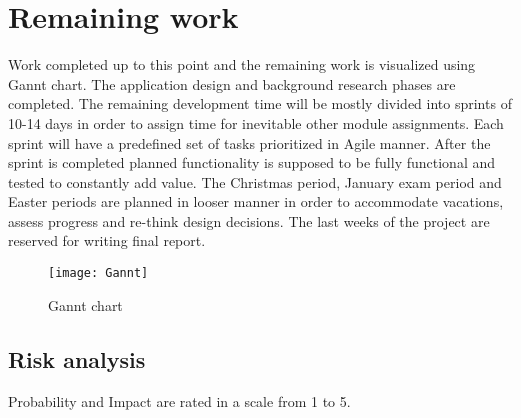 \section{Remaining work}

Work completed up to this point and the remaining work is visualized using Gannt chart. The application design and background research phases are completed. The remaining development time will be mostly divided into sprints of 10-14 days in order to assign time for inevitable other module assignments. Each sprint will have a predefined set of tasks prioritized in Agile manner. After the sprint is completed planned functionality is supposed to be fully functional and tested to constantly add value. The Christmas period, January exam period and Easter periods are planned in looser manner in order to accommodate vacations, assess progress and re-think design decisions. The last weeks of the project are reserved for writing final report.

\begin{figure}
\caption{Gannt chart}
\texttt{[image: Gannt]}
\centering
\end{figure}


\subsection{Risk analysis}
Probability and Impact are rated in a scale from 1 to 5.

\def\riska{Loss of source code at some stage of development}
\def \probabilitya {1}
\def \impacta {4}
\def \mitigationa {Use of remote source control  repository to frequently record every stage of the development, thus being able to recover it if needed. }

\def\riskaa{Unable to fulfill all of the requirements due to technical implemention difficulties}
\def \probabilityaa {3}
\def \impactaa {2}
\def \mitigationaa {During the start of development process requirements will be split into tasks, divided into sprints and ranked using Agile methodology, therefore ensuring that core functionality will be implemented first and a working proof of concept is available at the end of the project }

\def\riskaaa{Loss of development time due to other course modules}
\def \probabilityaaa {2}
\def \impactaaa {2}
\def \mitigationaaa {Dedicate fixed amount of time every week for the project in order to keep up with the schedule }

\def\riskaaaa{Some part of the project taking up significantly longer that expected}
\def \probabilityaaaa {3}
\def \impactaaaa {2}
\def \mitigationaaaa {Re-evaluate task importance and readjust development schedule in order to deliver functional prototype }

